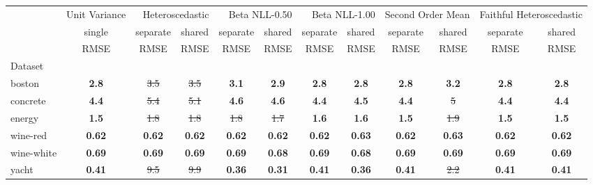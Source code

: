 \begin{tabular}{l|c|cc|cc|cc|cc|cc}
\toprule
{} & {Unit Variance} & \multicolumn{2}{r}{Heteroscedastic} & \multicolumn{2}{r}{Beta NLL-0.50} & \multicolumn{2}{r}{Beta NLL-1.00} & \multicolumn{2}{r}{Second Order Mean} & \multicolumn{2}{r}{Faithful Heteroscedastic} \\
{} & {single} & {separate} & {shared} & {separate} & {shared} & {separate} & {shared} & {separate} & {shared} & {separate} & {shared} \\
{} & {RMSE} & {RMSE} & {RMSE} & {RMSE} & {RMSE} & {RMSE} & {RMSE} & {RMSE} & {RMSE} & {RMSE} & {RMSE} \\
{Dataset} & {} & {} & {} & {} & {} & {} & {} & {} & {} & {} & {} \\
\midrule
boston & \textbf{2.8} & \sout{3.5} & \sout{3.5} & \textbf{3.1} & \textbf{2.9} & \textbf{2.8} & \textbf{2.8} & \textbf{2.8} & \textbf{3.2} & \textbf{2.8} & \textbf{2.8} \\
concrete & \textbf{4.4} & \sout{5.4} & \sout{5.1} & \textbf{4.6} & \textbf{4.6} & \textbf{4.4} & \textbf{4.5} & \textbf{4.4} & \sout{5} & \textbf{4.4} & \textbf{4.4} \\
energy & \textbf{1.5} & \sout{1.8} & \sout{1.8} & \sout{1.8} & \sout{1.7} & \textbf{1.6} & \textbf{1.6} & \textbf{1.5} & \sout{1.9} & \textbf{1.5} & \textbf{1.5} \\
wine-red & \textbf{0.62} & \textbf{0.62} & \textbf{0.62} & \textbf{0.62} & \textbf{0.62} & \textbf{0.62} & \textbf{0.63} & \textbf{0.62} & \textbf{0.63} & \textbf{0.62} & \textbf{0.62} \\
wine-white & \textbf{0.69} & \textbf{0.69} & \textbf{0.69} & \textbf{0.69} & \textbf{0.68} & \textbf{0.69} & \textbf{0.68} & \textbf{0.69} & \textbf{0.69} & \textbf{0.69} & \textbf{0.69} \\
yacht & \textbf{0.41} & \sout{9.5} & \sout{9.9} & \textbf{0.36} & \textbf{0.31} & \textbf{0.41} & \textbf{0.36} & \textbf{0.41} & \sout{2.2} & \textbf{0.41} & \textbf{0.41} \\
\bottomrule
\end{tabular}
